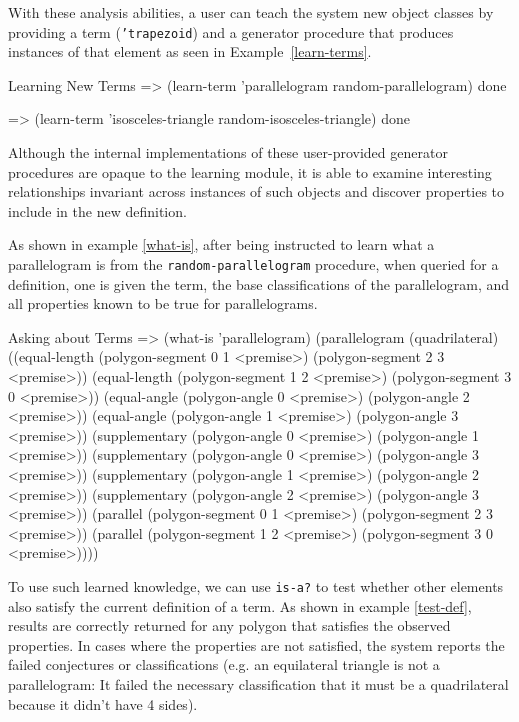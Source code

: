 With these analysis abilities, a user can teach the system new object
classes by providing a term (\texttt{'trapezoid}) and a generator
procedure that produces instances of that element as seen in
Example~\ref{learn-terms}.

\begin{repl-example}
[label=learn-terms]
{Learning New Terms}
=> (learn-term 'parallelogram random-parallelogram)
done

=> (learn-term 'isosceles-triangle random-isosceles-triangle)
done
\end{repl-example}

Although the internal implementations of these user-provided generator
procedures are opaque to the learning module, it is able to examine
interesting relationships invariant across instances of such objects
and discover properties to include in the new definition.

As shown in example \ref{what-is}, after being instructed to learn
what a parallelogram is from the \texttt{random-parallelogram}
procedure, when queried for a definition, one is given the term, the
base classifications of the parallelogram, and all properties known to
be true for parallelograms.

\begin{repl-example}
[label=what-is]
{Asking about Terms}
=> (what-is 'parallelogram)
(parallelogram
 (quadrilateral)
 ((equal-length (polygon-segment 0 1 <premise>)
                (polygon-segment 2 3 <premise>))
  (equal-length (polygon-segment 1 2 <premise>)
                (polygon-segment 3 0 <premise>))
  (equal-angle (polygon-angle 0 <premise>)
               (polygon-angle 2 <premise>))
  (equal-angle (polygon-angle 1 <premise>)
               (polygon-angle 3 <premise>))
  (supplementary (polygon-angle 0 <premise>)
                 (polygon-angle 1 <premise>))
  (supplementary (polygon-angle 0 <premise>)
                 (polygon-angle 3 <premise>))
  (supplementary (polygon-angle 1 <premise>)
                 (polygon-angle 2 <premise>))
  (supplementary (polygon-angle 2 <premise>)
                 (polygon-angle 3 <premise>))
  (parallel (polygon-segment 0 1 <premise>)
            (polygon-segment 2 3 <premise>))
  (parallel (polygon-segment 1 2 <premise>)
            (polygon-segment 3 0 <premise>))))
\end{repl-example}


To use such learned knowledge, we can use \texttt{is-a?} to test
whether other elements also satisfy the current definition of a
term. As shown in example \ref{test-def}, results are correctly
returned for any polygon that satisfies the observed properties. In
cases where the properties are not satisfied, the system reports the
failed conjectures or classifications (e.g. an equilateral triangle is
not a parallelogram: It failed the necessary classification that it
must be a quadrilateral because it didn't have 4 sides).

